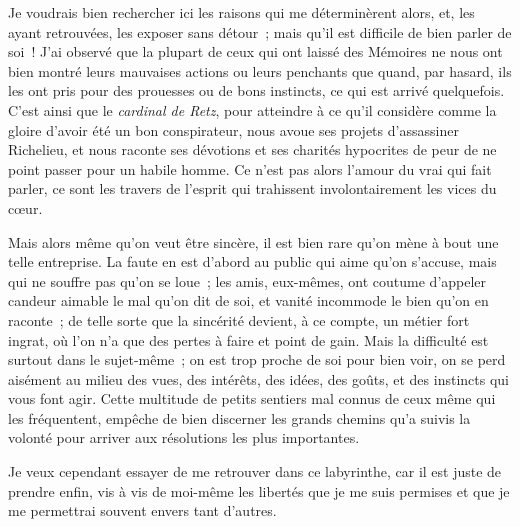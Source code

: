 	{Je voudrais bien rechercher ici les raisons qui me déterminèrent
alors, et, les ayant retrouvées, les exposer sans détour~; mais qu'il
est difficile de bien parler de soi~! J'ai observé que la plupart de
ceux qui ont laissé des Mémoires ne nous ont bien montré leurs
mauvaises actions ou leurs penchants que quand, par hasard, ils les
ont pris pour des prouesses ou de bons instincts, ce qui est arrivé
quelquefois. C'est ainsi que le \textit{cardinal de Retz}, pour
atteindre à ce qu'il considère comme la gloire d'avoir été un bon
conspirateur, nous avoue ses projets d'assassiner Richelieu, et nous
raconte ses dévotions et ses charités hypocrites de peur de ne point
passer pour un habile homme. Ce n'est pas alors l'amour du vrai qui
fait parler, ce sont les travers de l'esprit qui trahissent
involontairement les vices du cœur.

Mais alors même qu'on veut être sincère, il est bien rare qu'on mène à
bout une telle entreprise. La faute en est d'abord au public qui aime
qu'on s'accuse, mais qui ne souffre pas qu'on se loue~; les amis,
eux-mêmes, ont coutume d'appeler candeur aimable le mal qu'on dit de
soi, et vanité incommode le bien qu'on en raconte~; de telle sorte
que la sincérité devient, à ce compte, un métier fort ingrat, où l'on
n'a que des pertes à faire et point de gain. Mais la difficulté est
surtout dans le sujet-même~; on est trop proche de soi pour bien
voir, on se perd aisément au milieu des vues, des intérêts, des
idées, des goûts, et des instincts qui vous font agir. Cette
multitude de petits sentiers mal connus de ceux même qui les
fréquentent, empêche de bien discerner les grands chemins qu'a suivis
la volonté pour arriver aux résolutions les plus importantes.

Je veux cependant essayer de me retrouver dans ce labyrinthe, car il
est juste de prendre enfin, vis à vis de moi-même les libertés que je
me suis permises et que je me permettrai souvent envers tant
d'autres.
}

